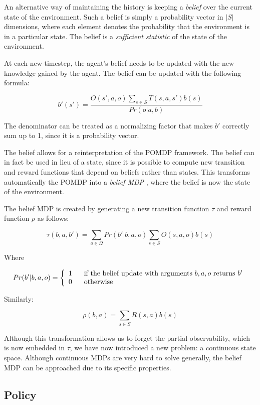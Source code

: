 An alternative way of maintaining the history is keeping a \textit{belief} over the current state of
the environment. Such a belief is simply a probability vector in $|S|$ dimensions, where each
element denotes the probability that the environment is in a particular state. The belief is a
\textit{sufficient statistic} of the state of the environment.

At each new timestep, the agent's belief needs to be updated with the new knowledge gained by the
agent. The belief can be updated with the following formula:

\[ b'(s') = \frac{O(s', a, o)\sum_{s\in S}T(s,a,s')b(s)}{Pr(o|a,b)} \]

The denominator can be treated as a normalizing factor that makes $b'$ correctly sum up to 1, since
it is a probability vector.

The belief allows for a reinterpretation of the POMDP framework. The belief can in fact be used in
lieu of a state, since it is possible to compute new transition and reward functions that depend on
beliefs rather than states. This transforms automatically the POMDP into a \textit{belief MDP}
\cite{cit:pomdp}, where the belief is now the state of the environment.

The belief MDP is created by generating a new transition function $\tau$ and reward function $\rho$
as follows:

\[ \tau(b,a,b') = \sum_{o\in \Omega} Pr(b' | b, a, o) \sum_{s\in S} O(s,a,o) b(s) \]

Where

\[Pr(b' | b, a, o) = \left\{
  \begin{array}{lr}
    1 \hspace{.6cm}\text{if the belief update with arguments $b,a,o$ returns $b'$}\\
    0 \hspace{.6cm}\text{otherwise}
  \end{array}
\right.
\]

Similarly:

\[ \rho(b,a) = \sum_{s\in S} R(s,a) b(s) \]

Although this transformation allows us to forget the partial observability, which is now embedded in
$\tau$, we have now introduced a new problem: a continuous state space. Although continuous MDPs are
very hard to solve generally, the belief MDP can be approached due to its specific properties.

\subsection{Policy}

